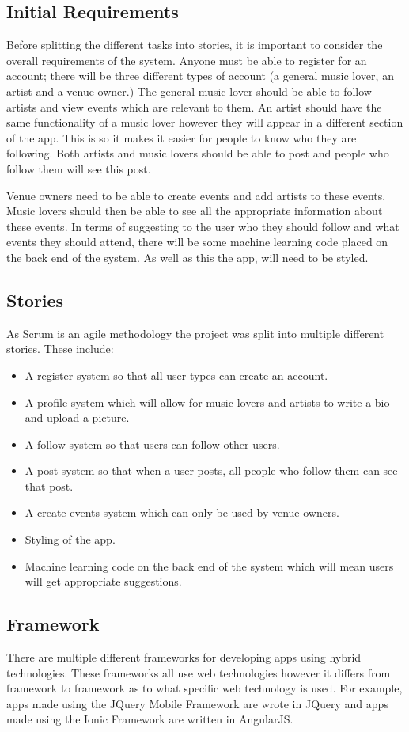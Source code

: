 \subsection{Initial Requirements}
Before splitting the different tasks into stories, it is important to consider the overall requirements of the system. Anyone must be able to register for an account; there will be three different types of account (a general music lover, an artist and a venue owner.) The general music lover should be able to follow artists and view events which are relevant to them. An artist should have the same functionality of a music lover however they will appear in a different section of the app. This is so it makes it easier for people to know who they are following. Both artists and music lovers should be able to post and people who follow them will see this post.

Venue owners need to be able to create events and add artists to these events. Music lovers should then be able to see all the appropriate information about these events. In terms of suggesting to the user who they should follow and what events they should attend, there will be some machine learning code placed on the back end of the system. As well as this the app, will need to be styled.

\subsection{Stories}
As Scrum is an agile methodology the project was split into multiple different stories. These include:
\begin{itemize}
	\item A register system so that all user types can create an account.
	\item A profile system which will allow for music lovers and artists to write a bio and upload a picture.
	\item A follow system so that users can follow other users.
	\item A post system so that when a user posts, all people who follow them can see that post.
	\item A create events system which can only be used by venue owners.
	\item Styling of the app.
	\item Machine learning code on the back end of the system which will mean users will get appropriate suggestions.
\end{itemize}

\subsection{Framework}
There are multiple different frameworks for developing apps using hybrid technologies. These frameworks all use web technologies however it differs from framework to framework as to what specific web technology is used. For example, apps made using the JQuery Mobile Framework are wrote in JQuery and apps made using the Ionic Framework are written in AngularJS.

